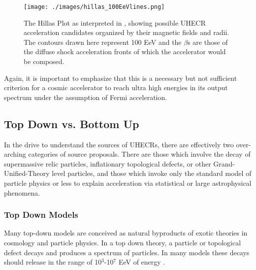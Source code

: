 \begin{figure}
\begin{center}
\texttt{[image: ./images/hillas\_100EeVlines.png]}
\caption[Hillas Plot]{The Hillas Plot as interpreted in \textcite{stanev}, showing possible UHECR acceleration candidates organized by their magnetic fields and radii. The contours drawn here represent 100 EeV and the $\beta$s are those of the diffuse shock acceleration fronts of which the accelerator would be composed.}
\label{hillasplot}
\end{center}
\end{figure}
Again, it is important to emphasize that this is a necessary but not sufficient criterion for a cosmic accelerator to reach ultra high energies in its output spectrum under the assumption of Fermi acceleration.%
\subsection{Top Down vs. Bottom Up}%
In the drive to understand the sources of UHECRs, there are effectively two over-arching categories of source proposals. There are those which involve the decay of supermassive relic particles, inflationary topological defects, or other Grand-Unified-Theory level particles, and those which invoke only the standard model of particle physics or less to explain acceleration via statistical or large astrophysical phenomena. 
\subsubsection{Top Down Models}%
Many top-down models are conceived as natural byproducts of exotic theories in cosmology and particle physics. In a top down theory, a particle or topological defect decays and produces a spectrum of particles. In many models these decays should release in the range of 10$^3$-10$^7$ EeV of energy \cite{stanev}. 


